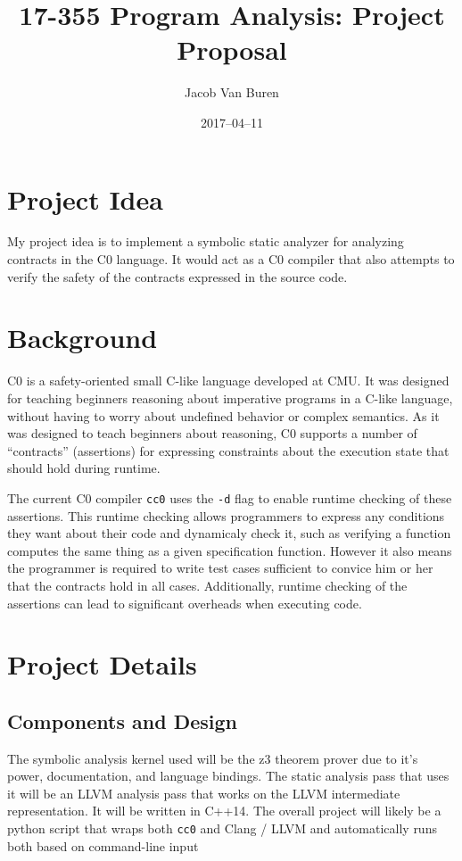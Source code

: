\documentclass[]{article}
\title{17-355 Program Analysis: Project Proposal}
\author{Jacob Van Buren}
\date{2017--04--11}
\begin{document}
\maketitle
\begin{multicols}{2}
\section{Project Idea}
My project idea is to implement a symbolic static analyzer for analyzing contracts in the C0 language.
It would act as a C0 compiler that also attempts to verify the safety of the contracts expressed in the source code.

\section{Background}
C0 is a safety-oriented small C-like language developed at CMU. It was designed for teaching beginners reasoning about imperative programs in a C-like language, without having to worry about undefined behavior or complex semantics.
As it was designed to teach beginners about reasoning, C0 supports a number of ``contracts'' (assertions) for expressing constraints about the execution state that should hold during runtime.

The current C0 compiler \texttt{cc0} uses the \texttt{-d} flag to enable runtime checking of these assertions. This runtime checking allows programmers to express any conditions they want about their code and dynamicaly check it, such as verifying a function computes the same thing as a given specification function. However it also means the programmer is required to write test cases sufficient to convice him or her that the contracts hold in all cases. Additionally, runtime checking of the assertions can lead to significant overheads when executing code.


\section{Project Details}
\subsection{Components and Design}
The symbolic analysis kernel used will be the z3 theorem prover due to it's power, documentation, and language bindings.
The static analysis pass that uses it will be an LLVM analysis pass that works on the LLVM intermediate representation. It will be written in C++14.
The overall project will likely be a python script that wraps both \texttt{cc0} and Clang / LLVM and automatically runs both based on command-line input


\end{multicols}
\end{document}
